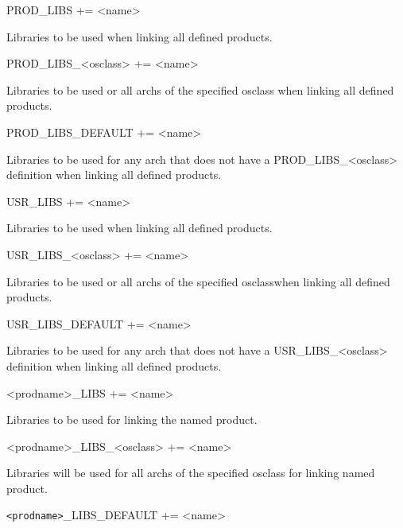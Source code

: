 \begin{description}

\item {}PROD\_LIBS += \textless{}name\textgreater{}

Libraries to be used when linking all defined products.

\item PROD\_LIBS\_\textless{}osclass\textgreater{} += \textless{}name\textgreater{}

Libraries to be used or all archs of the specified osclass when linking all defined products.

\item PROD\_LIBS\_DEFAULT += \textless{}name\textgreater{}

Libraries to be used for any arch that does not have a PROD\_LIBS\_\textless{}osclass\textgreater{} definition when linking all 
defined products.

\item

\item {}USR\_LIBS += \textless{}name\textgreater{}

Libraries to be used when linking all defined products.

\item USR\_LIBS\_\textless{}osclass\textgreater{} += \textless{}name\textgreater{}

Libraries to be used or all archs of the specified osclasswhen linking all defined products.

\item USR\_LIBS\_DEFAULT += \textless{}name\textgreater{}

Libraries to be used for any arch that does not have a USR\_LIBS\_\textless{}osclass\textgreater{} definition when linking all 
defined products.

\item \textless{}prodname\textgreater{}\_LIBS += \textless{}name\textgreater{}

Libraries to be used for linking the named product.

\item \textless{}prodname\textgreater{}\_LIBS\_\textless{}osclass\textgreater{} += \textless{}name\textgreater{}

Libraries will be used for all archs of the specified osclass for linking named product.

\item \verb|<prodname>|\_LIBS\_DEFAULT += \textless{}name\textgreater{}


\end{description}
